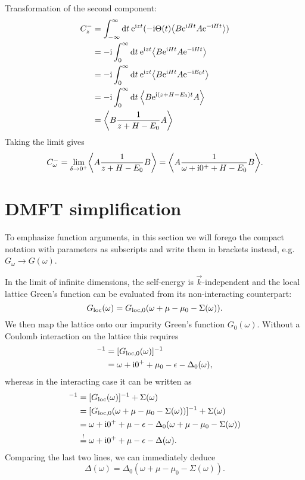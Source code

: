 Transformation of the second component:
\begin{align}
    C^-_z
     & =
    \int_{-\infty}^\infty \md t \>
    \me^{\mi zt}(-\mi \Theta(t) \expval*{B \me^{\mi Ht} A \me^{-\mi Ht}}) \\
     & =
    -\mi \int_0^\infty \md t \>
    \me^{\mi zt} \expval*{B \me^{\mi Ht} A \me^{-\mi Ht}}                 \\
     & =
    -\mi \int_0^\infty \md t \>
    \me^{\mi zt} \expval*{B \me^{\mi Ht} A \me^{-\mi E_0t}}               \\
     & =
    -\mi \int_0^\infty \md t \>
    \expval*{B \me^{\mi(z + H - E_0)t} A}                                 \\
     & =
    \expval*{B \frac{1}{z + H - E_0} A}
\end{align}
Taking the limit gives
\begin{equation}
    C^-_\omega
    =
    \lim_{\delta\to0^+} \expval*{A \frac{1}{z + H - E_0} B}
    =
    \expval*{A \frac{1}{\omega + \mi0^+ + H - E_0} B}.
\end{equation}

\section{DMFT simplification}
\label{app:dmft-simplification}

To emphasize function arguments,
in this section we will forego the compact notation with parameters as subscripts
and write them in brackets instead,
e.g.\ $G_\omega \to G(\omega)$.

In the limit of infinite dimensions, the self-energy is $\vec{k}$-independent
and the local lattice Green's function can be evaluated from
its non-interacting counterpart:
\begin{equation}
    G_{\mathrm{loc}}(\omega)
    =
    G_{\mathrm{loc},0}(\omega + \mu - \mu_0 - \Sigma(\omega)).
\end{equation}
We then map the lattice onto our impurity Green's function $G_0(\omega)$.
Without a Coulomb interaction on the lattice this requires
\begin{align}
    [G_0(\omega)]^{-1}
     & =
    [G_{\mloc,0}(\omega)]^{-1} \\
     & =
    \omega + \mi0^+ + \mu_0 - \epsilon - \Delta_0(\omega),
\end{align}
whereas in the interacting case it can be written as
\begin{align}
    [G_0(\omega)]^{-1}
     & =
    [G_{\mloc}(\omega)]^{-1} + \Sigma(\omega)                                          \\
     & =
    [G_{\mloc,0}(\omega + \mu - \mu_0 - \Sigma(\omega))]^{-1} + \Sigma(\omega)         \\
     & =
    \omega + \mi0^+ + \mu - \epsilon - \Delta_0(\omega + \mu - \mu_0 - \Sigma(\omega)) \\
     & \stackrel{!}{=}
    \omega + \mi0^+ + \mu - \epsilon - \Delta(\omega).
\end{align}
Comparing the last two lines, we can immediately deduce
\begin{equation}
    \Delta(\omega) = \Delta_0(\omega + \mu - \mu_0 - \Sigma(\omega)).
\end{equation}
